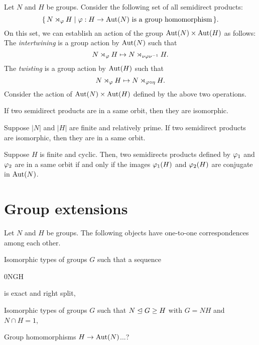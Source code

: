 \documentclass{../note}
\begin{document}
\begin{prb}
Let $N$ and $H$ be groups.
Consider the following set of all semidirect products:
\[\{\,N\rtimes_\varphi H\mid\varphi:H\to\operatorname{Aut}(N)\text{ is a group homomorphism}\,\}.\]
On this set, we can establish an action of the group $\operatorname{Aut}(N)\times\operatorname{Aut}(H)$ as follows:
The \emph{intertwining} is a group action by $\operatorname{Aut}(N)$ such that
\[N\rtimes_\varphi H\mapsto N\rtimes_{\nu\varphi\nu^{-1}}H.\]
The \emph{twisting} is a group action by $\operatorname{Aut}(H)$ such that
\[N\rtimes_\varphi H\mapsto N\rtimes_{\varphi\circ\eta}H.\]
Consider the action of $\operatorname{Aut}(N)\times\operatorname{Aut}(H)$ defined by the above two operations.
\begin{parts}
\item If two semidirect products are in a same orbit, then they are isomorphic.
\item Suppose $|N|$ and $|H|$ are finite and relatively prime. If two semidirect products are isomorphic, then they are in a same orbit.
\item Suppose $H$ is finite and cyclic. Then, two semidirects products defined by $\varphi_1$ and $\varphi_2$ are in a same orbit if and only if the images $\varphi_1(H)$ and $\varphi_2(H)$ are conjugate in $\operatorname{Aut}(N)$.
\item 
\end{parts}
\end{prb}
\begin{pf}

\end{pf}



\section{Group extensions}

\begin{prb}
Let $N$ and $H$ be groups.
The following objects have one-to-one correspondences among each other.
\begin{parts}
\item Isomorphic types of groups $G$ such that a sequence \begin{es}0\>N\>G\>H\end{es} is exact and right split,
\item Isomorphic types of groups $G$ such that $N\trianglelefteq G\ge H$ with $G=NH$ and $N\cap H=1$,
\item Group homomorphisms $H\to\operatorname{Aut}(N)$...?
\end{parts}
\end{prb}
\end{document}
